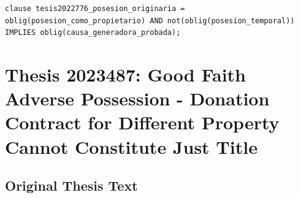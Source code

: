 \documentclass[11pt,a4paper]{article}
\begin{document}
\begin{lstlisting}[style=witnessstyle, language=Witness]
clause tesis2022776_posesion_originaria = oblig(posesion_como_propietario) AND not(oblig(posesion_temporal)) IMPLIES oblig(causa_generadora_probada);
\end{lstlisting}

\newpage

\section{Thesis 2023487: Good Faith Adverse Possession - Donation Contract for Different Property Cannot Constitute Just Title}
\label{thesis:2023487}

\subsection{Original Thesis Text}
\end{document}
